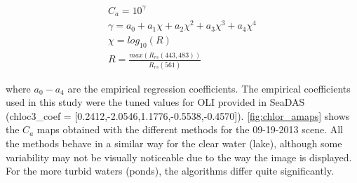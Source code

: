 \begin{equation}
\begin{gathered}
  C_a = 10^{\gamma}\\
  \gamma = a_0+a_1\chi+a_2\chi^2+a_3\chi^3+a_4\chi^4\\
  \chi = log_{10}(R)\\
  R = \frac{max(R_{rs}(443,483))}{R_{rs}(561)}
\end{gathered}
\end{equation}

\noindent where $a_0-a_4$ are the empirical regression coefficients. The empirical coefficients used in this study were the tuned values for OLI provided in SeaDAS (chloc3\_coef = [0.2412,-2.0546,1.1776,-0.5538,-0.4570]).
\autoref{fig:chlor_amaps} shows the $C_a$ maps obtained with the different methods for the 09-19-2013 scene. All the methods behave in a similar way for the clear water (lake), although some variability may not be visually noticeable due to the way the image is displayed. For the more turbid waters (ponds), the algorithms differ quite significantly. 
